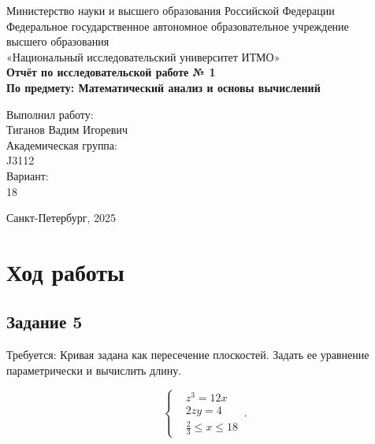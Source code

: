 \documentclass[a4paper,12pt]{article}
\begin{document}
\thispagestyle{empty}
\begin{center}
    \large
    Министерство науки и высшего образования Российской Федерации\\
    Федеральное государственное автономное образовательное учреждение\\
    высшего образования\\
    «Национальный исследовательский университет ИТМО»\\
    \vspace{5cm}
    \textbf{Отчёт по исследовательской работе № 1}\\
    \textbf{По предмету: Математический анализ и основы вычислений}\\
    \vspace{6cm}
    \begin{flushright}
        Выполнил работу:\\ Тиганов Вадим Игоревич\\
        \vspace{1cm}
        Академическая группа: \\ J3112\\
        \vspace{1cm}
        Вариант: \\18
    \end{flushright}
    \vspace{1cm}
    \vspace{3cm}
    \begin{center}
        Санкт-Петербург, 2025\\
    \end{center}
\end{center}

\newpage


\section{Ход работы}


\subsection{Задание 5}

Требуется:
Кривая задана как пересечение плоскостей. Задать ее уравнение
параметрически и вычислить длину.

\begin{equation}
    \begin{cases}
        &z^3 = 12x\\
        &2zy = 4\\
        &\frac{2}{3} \le x \le 18
        
    \end{cases}\,.
\end{equation}
\end{document}
